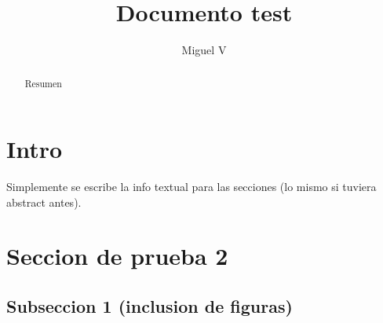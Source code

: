 \documentclass{article}
\title{Documento test}
\author{Miguel V}
\begin{document}
\maketitle

\begin{abstract}
    Resumen
\end{abstract}

\section{Intro}

Simplemente se escribe la info textual para las secciones (lo mismo si tuviera abstract antes).

\section{Seccion de prueba 2}
\subsection{Subseccion 1 (inclusion de figuras)}

\begin{figure}
    \centering
    
\end{figure}
\end{document}
